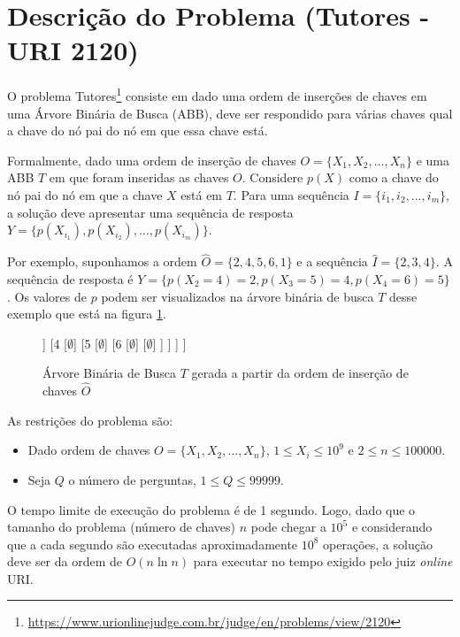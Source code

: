 \section{Descrição do Problema (Tutores - URI 2120)} \label{sec:tutores}

O problema Tutores\footnote{\url{https://www.urionlinejudge.com.br/judge/en/problems/view/2120}}
consiste em dado uma ordem de inserções de chaves em uma Árvore
Binária de Busca (ABB), deve ser respondido para várias chaves qual a chave do nó
pai do nó em que essa chave está.

Formalmente, dado uma ordem de inserção de chaves $O = \{X_1, X_2, \ldots, X_n\}$ e
uma ABB $T$ em que foram inseridas as chaves $O$. Considere $p(X)$ como a chave
do nó pai do nó em que a chave $X$ está em $T$. Para uma sequência $I = \{i_1, i_2, \ldots, i_m\}$,
a solução deve apresentar uma sequência de resposta $Y = \{p(X_{i_1}), p(X_{i_2}), \ldots, p(X_{i_m})\}$.

Por exemplo, suponhamos a ordem $\hat{O} = \{2, 4, 5, 6, 1\}$ e a sequência $\hat{I} = \{2, 3, 4\}$.
A sequência de resposta é $Y = \{p(X_2 = 4) = 2, p(X_3 = 5) = 4, p(X_4 = 6) = 5\}$. Os valores
de $p$ podem ser visualizados na árvore binária de busca $T$ desse exemplo que 
está na figura \ref{fig:abb_exemplo}.

\begin{figure}[!htb]
\centering
\begin{forest}
[2
	[1
		[$\emptyset$]
		[$\emptyset$]
	]
	[4
		[$\emptyset$]
		[5
			[$\emptyset$]
			[6
				[$\emptyset$]
				[$\emptyset$]
			]
		]
	]
]
\end{forest}
\caption{Árvore Binária de Busca $T$ gerada a partir da ordem de inserção de chaves $\hat{O}$}
\label{fig:abb_exemplo}
\end{figure}

As restrições do problema são:
\begin{itemize}
\item Dado ordem de chaves $O = \{X_1, X_2, \ldots, X_n\}$, $1 \leq X_i \leq 10^9$ e $2 \leq n \leq 100000$.
\item Seja $Q$ o número de perguntas, $1 \leq Q \leq 99999$.
\end{itemize}

O tempo limite de execução do problema é de 1 segundo. Logo, dado que o tamanho do problema (número de chaves) $n$ pode chegar a $10^5$ e considerando que a cada segundo são executadas aproximadamente $10^8$ operações, a solução deve ser da ordem de $O(n \ln n)$ para executar no tempo exigido pelo juiz \textit{online} URI.